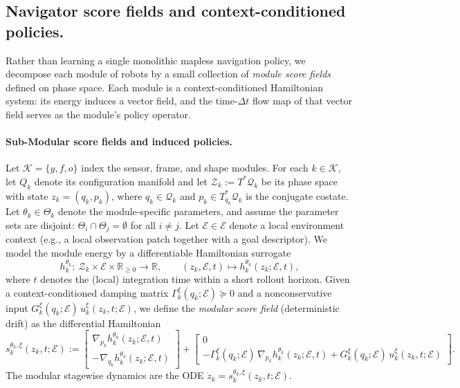 \subsection{Navigator score fields and context-conditioned policies.}
\label{subsec:modular_architecture}

Rather than learning a single monolithic mapless navigation policy, we decompose each module of robots by a small collection of
\emph{module score fields} defined on phase space. Each module is a context-conditioned Hamiltonian system: its energy
induces a vector field, and the time-$\Delta t$ flow map of that vector field serves as the module's policy operator.

\paragraph{Sub-Modular score fields and induced policies.}
Let $\mathcal K=\{y,f,o\}$ index the sensor, frame, and shape modules. For each $k\in\mathcal K$, let $Q_k$ denote its
configuration manifold and let $\mathcal Z_k:=T^*\mathcal{Q}_k$ be its phase space with state $z_k=(q_k,p_k)$, where
$q_k\in \mathcal{Q}_k$ and $p_k\in T^*_{q_k}\mathcal{Q}_k$ is the conjugate costate.
Let $\theta_k\in\Theta_k$ denote the module-specific parameters, and assume the parameter sets are disjoint:
$\Theta_i\cap\Theta_j=\emptyset$ for all $i\neq j$.
Let $\mathcal E\in\mathscr E$ denote a local environment context (e.g., a local observation patch together with a goal descriptor).
We model the module energy by a differentiable Hamiltonian surrogate
\[
 h_k^{\theta_k}:\ \mathcal Z_k\times\mathscr E\times\mathbb R_{\ge 0}\to\mathbb R,\qquad (z_k,\mathcal E,t)\mapsto h_k^{\theta_k}(z_k;\mathcal E,t),
\]
where $t$ denotes the (local) integration time within a short rollout horizon.
Given a context-conditioned damping matrix $\Gamma_k^{\xi}(q_k;\mathcal E)\succeq 0$ and a nonconservative input
$G_k^{\xi}(q_k;\mathcal E)\,u_k^{\xi}(z_k,t;\mathcal E)$, { we define the \emph{modular score field} (deterministic drift) as the differential Hamiltonian 
{\small
\begin{equation}
\label{eq:module_score_field}
 s_k^{\theta_k,\xi}(z_k,t;\mathcal E)
 \!:=\!
 \begin{bmatrix}
 \nabla_{p_k} h_k^{\theta_k}(z_k;\mathcal E,t)\\
 -\nabla_{q_k} h_k^{\theta_k}(z_k;\mathcal E,t)
 \end{bmatrix}
 \!+\!
 \begin{bmatrix}
 0\\
 -\Gamma_k^{\xi}(q_k;\mathcal E)\,\nabla_{p_k} h_k^{\theta_k}(z_k;\mathcal E,t)+G_k^{\xi}(q_k;\mathcal E)\,u_k^{\xi}(z_k,t;\mathcal E)
 \end{bmatrix}.
\end{equation}
}
The modular stagewise} dynamics are the ODE $\dot z_k=s_k^{\theta_k,\xi}(z_k,t;\mathcal E)$.
